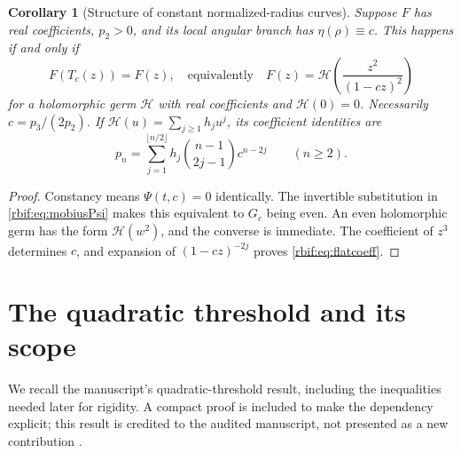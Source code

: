 \documentclass[11pt,a4paper]{article}
\newtheorem{corollary}[theorem]{Corollary}
\theoremstyle{definition}\newtheorem{definition}[theorem]{Definition}
\theoremstyle{remark}\newtheorem{remark}[theorem]{Remark}
\numberwithin{equation}{section}
\begin{document}
\begin{corollary}[Structure of constant normalized-radius curves]
\label{rbif:cor:flatstructure}
Suppose $F$ has real coefficients, $p_2>0$, and its local angular branch
has $\eta(\rho)\equiv c$. This happens if and only if
\begin{equation}
 F(T_c(z))=F(z),
 \quad\text{equivalently}\quad
 F(z)=\mathcal H\!\left(\frac{z^2}{(1-cz)^2}\right)
 \label{rbif:eq:flatstructure}
\end{equation}
for a holomorphic germ $\mathcal H$ with real coefficients and
$\mathcal H(0)=0$. Necessarily $c=p_3/(2p_2)$.
If $\mathcal H(u)=\sum_{j\ge1}h_ju^j$, its coefficient identities are
\begin{equation}
 p_n=\sum_{j=1}^{\lfloor n/2\rfloor}
           h_j\binom{n-1}{2j-1}c^{n-2j}\qquad(n\ge2).
 \label{rbif:eq:flatcoeff}
\end{equation}
\end{corollary}
\begin{proof}
Constancy means $\Psi(t,c)=0$ identically. The invertible substitution in
\eqref{rbif:eq:mobiusPsi} makes this equivalent to $G_c$ being even.
An even holomorphic germ has the form $\mathcal H(w^2)$, and the converse
is immediate. The coefficient of $z^3$ determines $c$, and expansion of
$(1-cz)^{-2j}$ proves \eqref{rbif:eq:flatcoeff}.
\end{proof}

\section{The quadratic threshold and its scope}
\label{rbif:sec:quadratic}
We recall the manuscript's quadratic-threshold result, including the
inequalities needed later for rigidity. A compact proof is included to
make the dependency explicit; this result is credited to the audited
manuscript, not presented as a new contribution \cite{rbif:local}.
\end{document}

